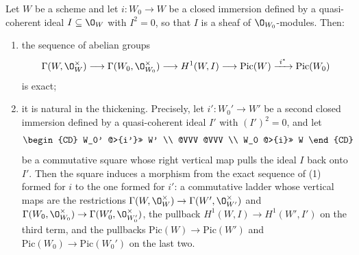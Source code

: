 \begin{proposition}
\label{prop:cube-picard-square-zero}
Let $W$ be a scheme and let $i\colon W_0\to W$ be a closed immersion defined by
a quasi-coherent ideal $I\subseteq\O_W$ with $I^2=0$, so that $I$ is a sheaf of
$\O_{W_0}$-modules.  Then:
\begin{enumerate}
  \item the sequence of abelian groups
  \[
    \Gamma(W,\O_W^\times)\longrightarrow\Gamma(W_0,\O_{W_0}^\times)
    \longrightarrow H^1(W,I)\longrightarrow\mathrm{Pic}(W)
    \xrightarrow{\ i^*\ }\mathrm{Pic}(W_0)
  \]
  is exact;
  \item it is natural in the thickening.  Precisely, let
  $i'\colon W_0'\to W'$ be a second closed immersion defined by a
  quasi-coherent ideal $I'$ with $(I')^2=0$, and let
  \[
    \begin{CD}
      W_0'  @>{i'}>>  W'  \\
      @VVV            @VVV \\
      W_0   @>{i}>>   W
    \end{CD}
  \]
  be a commutative square whose right vertical map pulls the ideal $I$ back
  onto $I'$.  Then the square induces a morphism from the exact sequence of
  (1) formed for $i$ to the one formed for $i'$: a commutative ladder whose
  vertical maps are the restrictions
  $\Gamma(W,\O_W^\times)\to\Gamma(W',\O_{W'}^\times)$ and
  $\Gamma(W_0,\O_{W_0}^\times)\to\Gamma(W_0',\O_{W_0'}^\times)$, the
  pullback $H^1(W,I)\to H^1(W',I')$ on the third term, and the pullbacks
  $\mathrm{Pic}(W)\to\mathrm{Pic}(W')$ and
  $\mathrm{Pic}(W_0)\to\mathrm{Pic}(W_0')$ on the last two.
\end{enumerate}
\end{proposition}
